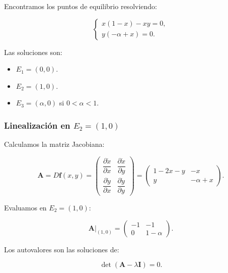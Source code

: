 Encontramos los puntos de equilibrio resolviendo:

\begin{equation}
    \begin{cases}
        x (1 - x) - x y = 0, \\
        y (-\alpha + x) = 0.
    \end{cases}
\end{equation}

Las soluciones son:

\begin{itemize}
    \item $E_1 = (0, 0)$.
    \item $E_2 = (1, 0)$.
    \item $E_3 = (\alpha, 0)$ si $0 < \alpha < 1$.
\end{itemize}

\subsubsection{Linealización en $E_2 = (1, 0)$}

Calculamos la matriz Jacobiana:

\begin{equation}
    \mathbf{A} = D\mathbf{f}(x, y) =
    \begin{pmatrix}
        \dfrac{\partial \dot{x}}{\partial x} & \dfrac{\partial \dot{x}}{\partial y} \\
        \dfrac{\partial \dot{y}}{\partial x} & \dfrac{\partial \dot{y}}{\partial y}
    \end{pmatrix}
    =
    \begin{pmatrix}
        1 - 2x - y & -x \\
        y & -\alpha + x
    \end{pmatrix}.
\end{equation}

Evaluamos en $E_2 = (1, 0)$:

\begin{equation}
    \mathbf{A}|_{(1,0)} =
    \begin{pmatrix}
        -1 & -1 \\
        0 & 1 - \alpha
    \end{pmatrix}.
\end{equation}

Los autovalores son las soluciones de:

\begin{equation}
    \det(\mathbf{A} - \lambda \mathbf{I}) = 0.
\end{equation}

